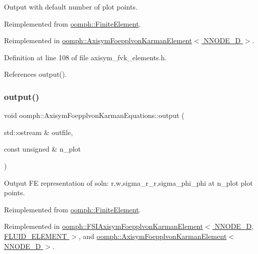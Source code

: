 Output with default number of plot points. 



Reimplemented from \hyperlink{classoomph_1_1FiniteElement_a2ad98a3d2ef4999f1bef62c0ff13f2a7}{oomph\+::\+Finite\+Element}.



Reimplemented in \hyperlink{classoomph_1_1AxisymFoepplvonKarmanElement_a76cf09e19fc810a96251a64572248f76}{oomph\+::\+Axisym\+Foepplvon\+Karman\+Element$<$ N\+N\+O\+D\+E\+\_\+D $>$}.



Definition at line 108 of file axisym\+\_\+fvk\+\_\+elements.\+h.



References output().

\mbox{\label{classoomph_1_1AxisymFoepplvonKarmanEquations_a704051a00a2c8624edb98f3ba05e63a2}} 
\subsubsection{\texorpdfstring{output()}{output()}\hspace{0.1cm}{\footnotesize\ttfamily [2/8]}}
{\footnotesize\ttfamily void oomph\+::\+Axisym\+Foepplvon\+Karman\+Equations\+::output (\begin{DoxyParamCaption}\item[{std\+::ostream \&}]{outfile,  }\item[{const unsigned \&}]{n\+\_\+plot }\end{DoxyParamCaption})\hspace{0.3cm}{\ttfamily [virtual]}}



Output FE representation of soln\+: r,w,sigma\+\_\+r\+\_\+r,sigma\+\_\+phi\+\_\+phi at n\+\_\+plot plot points. 



Reimplemented from \hyperlink{classoomph_1_1FiniteElement_afa9d9b2670f999b43e6679c9dd28c457}{oomph\+::\+Finite\+Element}.



Reimplemented in \hyperlink{classoomph_1_1FSIAxisymFoepplvonKarmanElement_a03c82e935db8c1c93dfe2f443ec5e817}{oomph\+::\+F\+S\+I\+Axisym\+Foepplvon\+Karman\+Element$<$ N\+N\+O\+D\+E\+\_\+D, F\+L\+U\+I\+D\+\_\+\+E\+L\+E\+M\+E\+N\+T $>$}, and \hyperlink{classoomph_1_1AxisymFoepplvonKarmanElement_a435aab946dfcaa0b23e7df59e9bc3933}{oomph\+::\+Axisym\+Foepplvon\+Karman\+Element$<$ N\+N\+O\+D\+E\+\_\+D $>$}.

